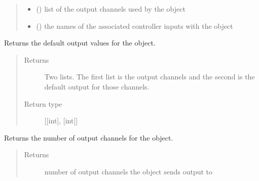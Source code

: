 \documentclass[letterpaper,10pt,english]{sphinxmanual}
\begin{document}
\begin{fulllineitems}
\begin{fulllineitems}
\begin{quote}
\begin{description}
\begin{itemize}
\item {} 
\sphinxAtStartPar
{} (\sphinxstyleliteralemphasis{\sphinxupquote{{[}}}\sphinxstyleliteralemphasis{\sphinxupquote{{]}}}) \textendash{} list of the output channels used by the object

\item {} 
\sphinxAtStartPar
{} (\sphinxstyleliteralemphasis{\sphinxupquote{{[}}}\sphinxstyleliteralemphasis{\sphinxupquote{{]}}}) \textendash{} the names of the associated controller inputs with 
the object

\end{itemize}

\end{description}\end{quote}

\end{fulllineitems}


\begin{fulllineitems}
\label{\detokenize{specific:EarOutput.EarOutput.get_default_outputs}}
\sphinxAtStartPar
Returns the default output values for the object.
\begin{quote}\begin{description}
\item[{Returns}] \leavevmode
\sphinxAtStartPar
Two lists. The first list is the output channels and the second 
is the default output for those channels.

\item[{Return type}] \leavevmode
\sphinxAtStartPar
{[}{[}int{]}, {[}int{]}{]}

\end{description}\end{quote}

\end{fulllineitems}


\begin{fulllineitems}
\label{\detokenize{specific:EarOutput.EarOutput.get_num_channels}}
\sphinxAtStartPar
Returns the number of output channels for the object.
\begin{quote}\begin{description}
\item[{Returns}] \leavevmode
\sphinxAtStartPar
number of output channels the object sends output to


\end{description}
\end{quote}
\end{fulllineitems}
\end{fulllineitems}
\end{document}
